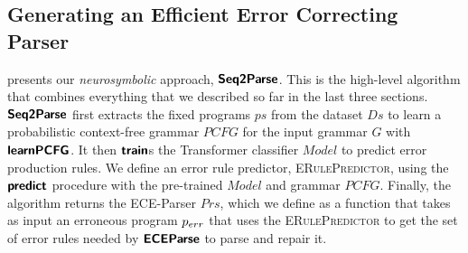 \subsection{Generating an Efficient Error Correcting Parser}
\label{sec:whole-system:building-ecp}



 presents our \emph{neurosymbolic} approach, $\bm{\mathsf{Seq2Parse}}$.
This is the high-level algorithm that combines everything that we described so
far in the last three sections. $\bm{\mathsf{Seq2Parse}}$ first extracts the fixed programs
$ps$ from the dataset $Ds$ to learn a probabilistic context-free grammar $PCFG$
for the input grammar $G$ with $\bm{\mathsf{learnPCFG}}$. It then $\bm{\mathsf{train}}$s the
Transformer classifier $Model$ to predict error production rules. We define an
error rule predictor, \textsc{ERulePredictor}, using the $\bm{\mathsf{predict}}$ procedure
with the pre-trained $Model$ and grammar $PCFG$. Finally, the algorithm returns
the ECE-Parser $Prs$, which we define as a function that takes as input an
erroneous program $p_{err}$ that uses the \textsc{ERulePredictor} to get the set
of error rules needed by $\bm{\mathsf{ECEParse}}$ to parse and repair it.
